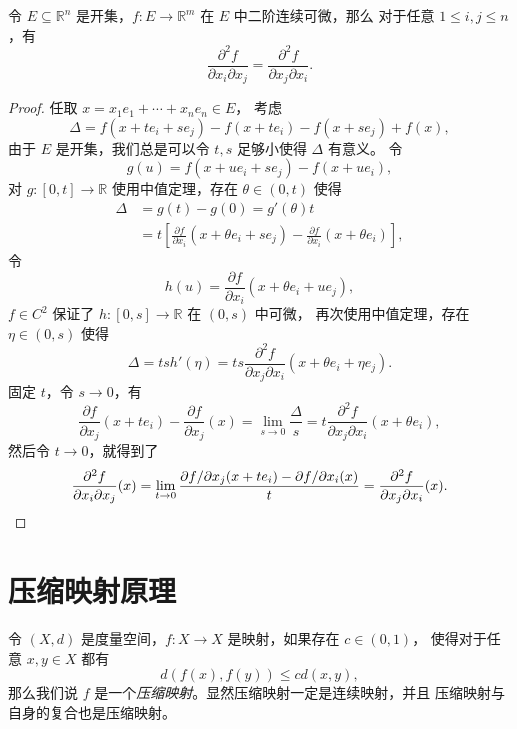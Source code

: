 \documentclass[fontset=none,zihao=-4]{Notes}
\begin{document}
\begin{theorem}
  令 $E\subseteq\mathbb{R}^n$ 是开集，$f:E\to \mathbb{R}^m$ 在 $E$ 中二阶连续可微，那么
  对于任意 $1\leq i,j\leq n$，有
  \[
    \frac{\partial^2 f }{\partial x_i\partial x_j}=\frac{\partial^2 f}{\partial x_j\partial x_i}.  
  \]
\end{theorem}
\begin{proof}
  任取 $x=x_1e_1+\cdots+x_ne_n\in E$，
  考虑
  \[
    \Delta =f(x+te_i+se_j)-f(x+te_i)-f(x+se_j)+f(x),  
  \]
  由于 $E$ 是开集，我们总是可以令 $t,s$ 足够小使得 $\Delta$ 有意义。
  令 
  \[ 
    g(u)=f(x+ue_i+se_j)-f(x+u e_i),
  \]
  对 $g:[0,t]\to\mathbb{R}$ 使用中值定理，存在 $\theta\in (0,t)$ 使得
  \begin{align*}
    \Delta&=g(t)-g(0)=g'(\theta)t\\
    &=t\left[\frac{\partial f}{\partial x_i}(x+\theta e_i+se_j)-
    \frac{\partial f}{\partial x_i}(x+\theta e_i)\right],
  \end{align*}
  令
  \[
    h(u)=  \frac{\partial f}{\partial x_i}(x+\theta e_i+ue_j),
  \]
  $f\in C^2$ 保证了 $h:[0,s]\to\mathbb{R}$ 在 $(0,s)$ 中可微，
  再次使用中值定理，存在 $\eta\in(0,s)$ 使得
  \[
    \Delta=tsh'(\eta)=ts\frac{\partial^2 f}{\partial x_j\partial x_i}(x+\theta e_i+\eta e_j).
  \]
  固定 $t$，令 $s\to 0$，有
  \[
    \frac{\partial f}{\partial x_j}(x+te_i)
    -\frac{\partial f}{\partial x_j}(x)=\lim_{s\to 0}\frac{\Delta}{s}=
    t \frac{\partial^2 f}{\partial x_j\partial x_i}(x+\theta e_i),  
  \]
  然后令 $t\to 0$，就得到了
  \[
    \frac{\partial^2 f}{\partial x_i\partial x_j}(x)=\lim_{t\to 0}
    \frac{\partial f /\partial x_j(x+te_i)-\partial f/\partial x_i(x)}{t}
    =\frac{\partial^2 f}{\partial x_j\partial x_i}(x).\qedhere
  \]
\end{proof}

\section{压缩映射原理}

令 $(X,d)$ 是度量空间，$f:X\to X$ 是映射，如果存在 $c\in(0,1)$，
使得对于任意 $x,y\in X$ 都有
\[
  d(f(x),f(y))\leq cd(x,y),  
\]
那么我们说 $f$ 是一个\emph{压缩映射}。显然压缩映射一定是连续映射，并且
压缩映射与自身的复合也是压缩映射。
\end{document}
